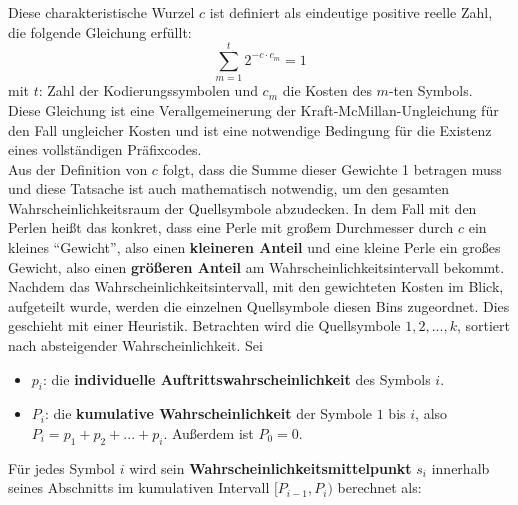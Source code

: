 \documentclass[a4paper,10pt,ngerman]{scrartcl}
\begin{document}
Diese charakteristische Wurzel $c$ ist definiert als eindeutige positive reelle Zahl, die folgende Gleichung erfüllt: 
\begin{equation}
  \sum_{m=1}^{t}2^{-c \cdot c_{m}} = 1
  \label{eq:4}
\end{equation}
mit $t$: Zahl der Kodierungssymbolen und $c_{m}$ die Kosten des $m$-ten Symbols. \\Diese Gleichung ist eine Verallgemeinerung der Kraft-McMillan-Ungleichung für den Fall ungleicher Kosten und ist eine notwendige Bedingung für die Existenz eines vollständigen Präfixcodes. \\
\newline
Aus der Definition von $c$ folgt, dass die Summe dieser Gewichte 1 betragen muss und diese Tatsache ist auch mathematisch notwendig, um den gesamten Wahrscheinlichkeitsraum der Quellsymbole abzudecken. In dem Fall mit den Perlen heißt das konkret, dass eine Perle mit großem Durchmesser durch $c$ ein kleines “Gewicht”, also einen \textbf{kleineren Anteil} und eine kleine Perle ein großes Gewicht, also einen \textbf{größeren Anteil} am Wahrscheinlichkeitsintervall bekommt. \\
\newline
Nachdem das Wahrscheinlichkeitsintervall, mit den gewichteten Kosten im Blick, aufgeteilt wurde, werden die einzelnen Quellsymbole diesen Bins zugeordnet. Dies geschieht mit einer Heuristik.
Betrachten wird die Quellsymbole $1, 2, ..., k$, sortiert nach absteigender Wahrscheinlichkeit. Sei 
\begin{itemize}
  \item $p_i$: die \textbf{individuelle Auftrittswahrscheinlichkeit} des Symbols $i$.
  \item $P_i$: die \textbf{kumulative Wahrscheinlichkeit} der Symbole $1$ bis $i$, also $P_i = p_1 + p_2 + ... + p_i$. Außerdem ist $P_0 = 0$.
\end{itemize}
Für jedes Symbol $i$ wird sein \textbf{Wahrscheinlichkeitsmittelpunkt} $s_i$ innerhalb seines Abschnitts im kumulativen Intervall $[P_{i-1}, P_i)$ berechnet als:
\end{document}

